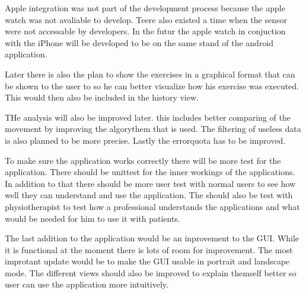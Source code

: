 Apple integration was not part of the development process because the apple watch was not avaliable to develop. Teere also existed a time when the sensor were not accessable by developers. In the futur the apple watch in conjuction with the iPhone will be developed to be on the same stand of the android application.

Later there is also the plan to show the exercises in a graphical format that can be shown to the user to so he can better visualize how his exercise was executed. This would then also be included in the history view. 

THe analysis will also be improved later. this includes better comparing of the movement by improving the algorythem that is used. The filtering of useless data is also planned to be more precise. Lastly the errorquota has to be improved.

To make sure the application works correctly there will be more test for the application. There should be  unittest for the inner workings of the applications. In addition to that there should be more user test with normal users to see how well they can understand and use the application. The should also be test with physiotherapist to test how a professional understands the applications and what would be needed for him to use it with patients.

The last addition to the application would be an inprovement to the GUI. While it is functional at the moment there is lots of room for improvement. The most improtant update would be to make the GUI usable in portrait and landscape mode. The different views should also be improved to explain themself better so user can use the application more intuitively.


